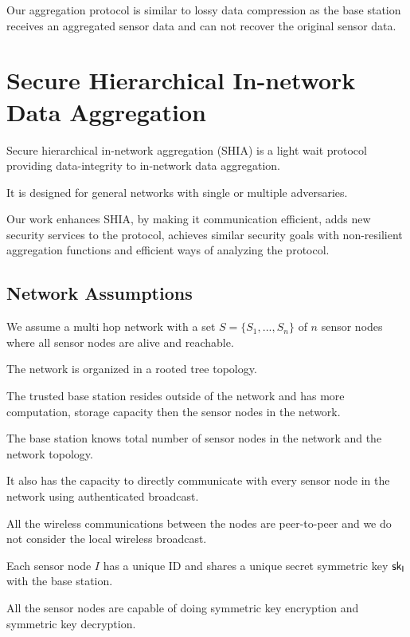 \documentclass[%
  slidesonly,%
  semlayer%
  ]{seminar}                                  %
\begin{document}
\begin{slide}
    Our aggregation protocol is similar to lossy data compression as the base station receives an aggregated sensor data and can not recover the original sensor data.

    \clearpage

\section*{Secure Hierarchical In-network Data Aggregation}
    
    Secure hierarchical in-network aggregation (SHIA) is a light wait protocol providing data-integrity to in-network data aggregation.
    
    It is designed for general networks with single or multiple adversaries.
    
    Our work enhances SHIA, by making it communication efficient, adds new security services to the protocol, achieves similar security goals with non-resilient aggregation functions and efficient ways of analyzing the protocol.
  
    \clearpage

    \subsection*{Network Assumptions}
      We assume a multi hop network with a set $ S = \{S_{1},...,S_{n}\} $ of $n$ sensor nodes where all sensor nodes are alive and reachable. 

      The network is organized in a rooted tree topology.

      The trusted base station resides outside of the network and has more computation, storage capacity then the sensor nodes in the network. 

      The base station knows total number of sensor nodes in the network and the network topology. 

      It also has the capacity to directly communicate with every sensor node in the network using authenticated broadcast.

      All the wireless communications between the nodes are peer-to-peer and we do not consider the local wireless broadcast.

      Each sensor node $I$ has a unique ID and shares a unique secret symmetric key $\sf{sk}_{I}$ with the base station.

      All the sensor nodes are capable of doing symmetric key encryption and symmetric key decryption.


\end{slide}
\end{document}
